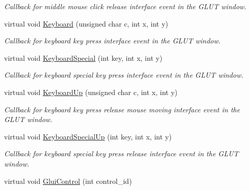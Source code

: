 \begin{DoxyCompactItemize}
\begin{DoxyCompactList}\small\item\em Callback for middle mouse click release interface event in the G\+L\+UT window. \end{DoxyCompactList}\item 
virtual void \hyperlink{classimage__tools_1_1BaseGfxApp_afe086488f233d55e1dfd4bf4883b7cb8}{Keyboard} (unsigned char c, int x, int y)\hypertarget{classimage__tools_1_1BaseGfxApp_afe086488f233d55e1dfd4bf4883b7cb8}{}\label{classimage__tools_1_1BaseGfxApp_afe086488f233d55e1dfd4bf4883b7cb8}

\begin{DoxyCompactList}\small\item\em Callback for keyboard key press interface event in the G\+L\+UT window. \end{DoxyCompactList}\item 
virtual void \hyperlink{classimage__tools_1_1BaseGfxApp_aba20c48d82b9da16e9e5d716e404a8df}{Keyboard\+Special} (int key, int x, int y)\hypertarget{classimage__tools_1_1BaseGfxApp_aba20c48d82b9da16e9e5d716e404a8df}{}\label{classimage__tools_1_1BaseGfxApp_aba20c48d82b9da16e9e5d716e404a8df}

\begin{DoxyCompactList}\small\item\em Callback for keyboard special key press interface event in the G\+L\+UT window. \end{DoxyCompactList}\item 
virtual void \hyperlink{classimage__tools_1_1BaseGfxApp_a156d7877e6ed3c3d7707618ebad15e9b}{Keyboard\+Up} (unsigned char c, int x, int y)\hypertarget{classimage__tools_1_1BaseGfxApp_a156d7877e6ed3c3d7707618ebad15e9b}{}\label{classimage__tools_1_1BaseGfxApp_a156d7877e6ed3c3d7707618ebad15e9b}

\begin{DoxyCompactList}\small\item\em Callback for keyboard key press release mouse moving interface event in the G\+L\+UT window. \end{DoxyCompactList}\item 
virtual void \hyperlink{classimage__tools_1_1BaseGfxApp_a548437fcd4b0c87fa5e5c46d68f38683}{Keyboard\+Special\+Up} (int key, int x, int y)\hypertarget{classimage__tools_1_1BaseGfxApp_a548437fcd4b0c87fa5e5c46d68f38683}{}\label{classimage__tools_1_1BaseGfxApp_a548437fcd4b0c87fa5e5c46d68f38683}

\begin{DoxyCompactList}\small\item\em Callback for keyboard special key press release interface event in the G\+L\+UT window. \end{DoxyCompactList}\item 
virtual void \hyperlink{classimage__tools_1_1BaseGfxApp_a62fbfbb3b1f3e9d476e82c8e7640e78e}{Glui\+Control} (int control\+\_\+id)\hypertarget{classimage__tools_1_1BaseGfxApp_a62fbfbb3b1f3e9d476e82c8e7640e78e}{}\label{classimage__tools_1_1BaseGfxApp_a62fbfbb3b1f3e9d476e82c8e7640e78e}


\end{DoxyCompactItemize}
